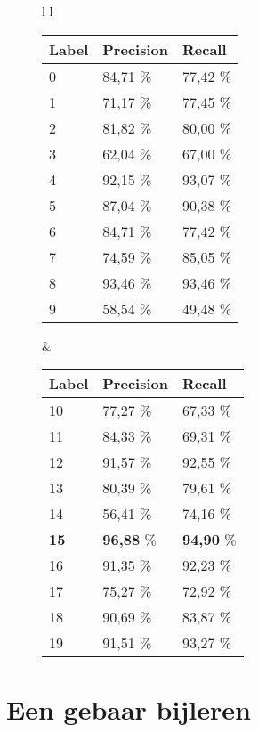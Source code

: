 \begin{figure}
	\vspace{1cm}
	\begin{tabular}{l l}
		\begin{tabular}{l l l}
			\hline
			\textbf{Label} & \textbf{Precision} &
			\textbf{Recall}\\
			\hline
			0 & 84,71 \% & 77,42 \% \\
			1 & 71,17 \% & 77,45 \% \\
			2 & 81,82 \% & 80,00 \% \\
			3 & 62,04 \% & 67,00 \% \\
			4 & 92,15 \% & 93,07 \% \\
			5 & 87,04 \% & 90,38 \% \\
			6 & 84,71 \% & 77,42 \% \\
			7 & 74,59 \% & 85,05 \% \\
			8 & 93,46 \% & 93,46 \% \\
			9 & 58,54 \% & 49,48 \% \\
			\hline
		\end{tabular} & 
		\begin{tabular}{l l l}
			\hline
			\textbf{Label} & \textbf{Precision} &
			\textbf{Recall}\\
			\hline
			10 & 77,27 \% & 67,33 \% \\
			11 & 84,33 \% & 69,31 \% \\
			12 & 91,57 \% & 92,55 \% \\
			13 & 80,39 \% & 79,61 \% \\
			14 & 56,41 \% & 74,16 \% \\
			\textbf{15} & \textbf{96,88} \% & \textbf{94,90} \% \\
			16 & 91,35 \% & 92,23 \% \\
			17 & 75,27 \% & 72,92 \% \\
			18 & 90,69 \% & 83,87 \% \\
			19 & 91,51 \% & 93,27 \% \\
			\hline
		\end{tabular}	
	\end{tabular}
	\label{tab:pr-alle-klassen}
\end{figure}


\section{Een gebaar bijleren}\label{sec:experimenten}

